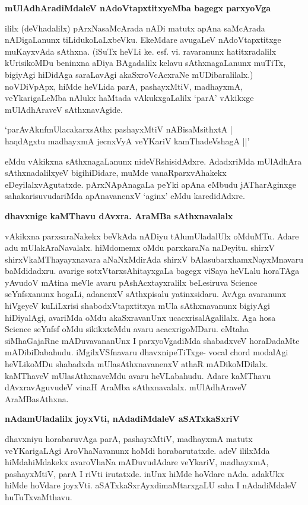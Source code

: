 {\bf mUlAdhAradiMdaleV nAdoVtapxtitxyeMba bagegx parxyoVga}

ililx (deVhadalilx) pArxNasaMcArada nADi matutx apAna saMcArada nADigaLanunx tiLidukoLaLxbeVku. EkeMdare avugaLeV nAdoVtapxtitxge muKayxvAda sAthxna. (iSuTx heVLi ke. esf. vi. ravaranunx hatitxradalilx kUrisikoMDu beninxna aDiya BAgadalilx kelavu sAthxnagaLanunx muTiTx, bigiyAgi hiDidAga saraLavAgi akaSxroVcAcxraNe mUDibaralilalx.) noVDiVpApx, hiMde heVLida parA, pashayxMtiV, madhayxmA, veYkarigaLeMba nAlukx haMtada vAkukxgaLalilx `parA' vAkikxge mUlAdhAraveV sAthxnavAgide.

\begin{shloka}
`parAvAknfmUlacakarxsAthx pashayxMtiV nABisaMsithxtA |\\
haqdAgxtu madhayxmA jecnxVyA veYKariV kamThadeVshagA ||'
\end{shloka}

eMdu vAkikxna sAthxnagaLanunx nideVRshisidAdxre. AdadxriMda mUlAdhAra sAthxnadalilxyeV bigihiDidare, muMde vanaRparxvAhakekx eDeyilalxvAgutatxde. pArxNApAnagaLa peYki apAna eMbudu jATharAginxge sahakarisuvudariMda apAnavanenxV `aginx' eMdu karedidAdxre.

{\bf dhavxnige kaMThavu dAvxra. AraMBa sAthxnavalalx}

vAkikxna parxsaraNakekx beVkAda nADiyu tAlumUladalUlx oMduMTu. Adare adu mUlakAraNavalalx. hiMdomemx oMdu parxkaraNa naDeyitu. shirxV shirxVkaMThayayxnavara aNaNxMdirAda shirxV bAlasubarxhamxNayxMnavaru baMdidadxru. avarige sotxVtarxsAhitayxgaLa bagegx viSaya heVLalu horaTAga yAvudoV mAtina meVle avaru pAshAcxtayxralilx beLesiruva {\rm Science} seYnfsxanunx hogaLi, adanenxV sAthxpisalu yatinxsidaru. AvAga avaranunx hiVgeyeV kuLiLxrisi shabodxVtapxtitxya mUla sAthxnavanunx bigiyAgi hiDiyalAgi, avariMda oMdu akaSxravanUnx ucacxrisalAgalilalx. Aga hosa {\rm Science} seYnfsf oMdu sikikxteMdu avaru acacxrigoMDaru. eMtaha siMhaGajaRne mADuvavananUnx I parxyoVgadiMda shabadxveV horaDadaMte mADibiDabahudu. iMgilxVSfnavaru dhavxnipeTiTxge- {\rm vocal chord} modalAgi heVLikoMDu shabadxda mUlasAthxnavanenxV athaR mADikoMDilalx. kaMThaveV mUlasAthxnaveMdu avaru heVLabahudu. Adare kaMThavu dAvxravAguvudeV vinaH AraMba sAthxnavalalx. mUlAdhAraveV AraMBasAthxna. 

{\bf nAdamUladalilx joyxVti, nAdadiMdaleV aSATxkaSxriV}

dhavxniyu horabaruvAga parA, pashayxMtiV, madhayxmA matutx veYKarigaLAgi AroVhaNavanunx hoMdi horabarutatxde. adeV ililxMda hiMdahiMdakekx avaroVhaNa mADuvudAdare veYkariV, madhayxmA, pashayxMtiV, parA I riVti irutatxde. inUnx hiMde hoVdare nAda. adakUkx hiMde hoVdare joyxVti. aSATxkaSxrAyxdimaMtarxgaLU saha I nAdadiMdaleV huTuTxvaMthavu.

